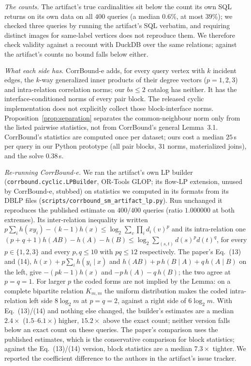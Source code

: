 \documentclass[11pt]{article}
\begin{document}
\emph{The counts.} The artifact's true cardinalities sit below the count its
own SQL returns on its own data on all $400$ queries (a median $0.6\%$, at
most $39\%$); we checked three queries by running the artifact's SQL
verbatim, and requiring distinct images for same-label vertices does not
reproduce them. We therefore check validity against a recount with DuckDB
over the same relations; against the artifact's counts no bound falls below
either.

\emph{What each side has.} CorrBound-e adds, for every query vertex with $k$
incident edges, the $k$-way generalized inner products of their degree
vectors ($p=1,2,3$) and intra-relation correlation norms; our $bs{\le}2$
catalog has neither. It has the interface-conditioned norms of every pair
block. The released cyclic implementation does not explicitly collect those block-interface norms. Proposition~\ref{prop:separation} separates the common-neighbour norm only from the listed pairwise statistics, not from CorrBound's general Lemma~3.1.
CorrBound's statistics are computed once per dataset; ours cost a median
$25$\,s per query in our Python prototype (all pair blocks, $31$ norms,
materialized joins), and the solve $0.38$\,s.

\emph{Re-running CorrBound-e.} We ran the artifact's own LP builder
(\texttt{corrbound.cyclic.LPBuilder}, OR-Tools GLOP; its flow-LP extension,
unused by CorrBound-e, stubbed) on statistics we computed in its formats
from its DBLP files (\texttt{scripts/corrbound\_sm\_artifact\_lp.py}). Run
unchanged it reproduces the published estimate on $400/400$ queries
(ratio $1.000000$ at both extremes). Its inter-relation inequality is
written $p\sum_i h(xy_i) - (k-1)h(x) \le \log_2\sum_v\prod_i d_i(v)^p$ and
its intra-relation one $(p+q+1)h(AB) - h(A) - h(B) \le \log_2\sum_{(s,t)}
d(s)^p d(t)^q$, for every $p\in\{1,2,3\}$ and every $p,q\le 10$ with $pq\le 12$ respectively. The paper's Eq.~(13) and (14),
$h(x)+p\sum_i h(y_i\mid x)$ and $h(AB)+p\,h(B\mid A)+q\,h(A\mid B)$ on the
left, give $-(pk-1)h(x)$ and $-p\,h(A)-q\,h(B)$; the two agree at
$p{=}q{=}1$. For larger $p$ the coded forms are not implied by the Lemma:
on a complete bipartite relation $K_{m,m}$ the uniform distribution makes
the coded intra-relation left side $8\log_2 m$ at $p{=}q{=}2$, against a
right side of $6\log_2 m$. With Eq.~(13)/(14) and nothing else changed,
the builder's estimates are a median $2.4\times$ ($1.5$--$6.1\times$)
higher, $15.2\times$ above the exact count; neither version falls below an
exact count on these queries. The paper's comparison uses the published
estimates, which is the conservative comparison for block statistics; against the Eq.~(13)/(14) version,
block statistics are a median $7.3\times$ tighter. We reported the coefficient difference to the authors in the artifact's issue tracker.
\end{document}
